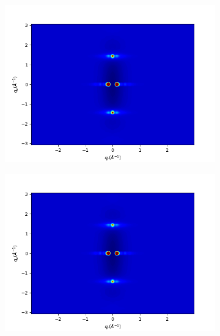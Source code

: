 \documentclass{article}
\begin{document}
  \begin{figure}
  \centering
  \begin{subfigure}{0.45\textwidth} 
  \includegraphics[width=\textwidth]{rzplot_ld0.png}
  \caption{}\label{fig:rzplot_ld0}
  \end{subfigure}
  \begin{subfigure}{0.45\textwidth} 
  \includegraphics[width=\textwidth]{rzplot_ld33.png}
  \caption{}\label{fig:rzplot_ld33}
  \end{subfigure}
  \begin{subfigure}{0.45\textwidth} 

\end{subfigure}
\end{figure}
\end{document}

